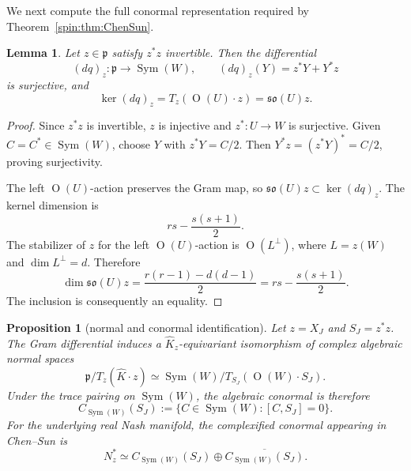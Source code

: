 \documentclass[11pt,reqno]{amsart}
\numberwithin{equation}{section}
\newtheorem{proposition}[theorem]{Proposition}
\newtheorem{lemma}[theorem]{Lemma}
\theoremstyle{definition}
\theoremstyle{remark}
\newcommand{\Or}{\operatorname{O}}
\newcommand{\Sym}{\operatorname{Sym}}
\newcommand{\fp}{\mathfrak p}
\begin{document}
We next compute the full conormal representation required by
Theorem~\ref{spin:thm:ChenSun}.

\begin{lemma}\label{spin:lem:dq}
Let $z\in\fp$ satisfy $z^*z$ invertible.  Then the differential
\[
  (dq)_z:\fp\longrightarrow\Sym(W),
  \qquad
  (dq)_z(Y)=z^*Y+Y^*z
\]
is surjective, and
\begin{equation}\label{spin:eq:kerdq}
  \ker(dq)_z=T_z(\Or(U)\cdot z)=\mathfrak{so}(U)z.
\end{equation}
\end{lemma}

\begin{proof}
Since $z^*z$ is invertible, $z$ is injective and $z^*:U\to W$ is surjective.
Given $C=C^*\in\Sym(W)$, choose $Y$ with $z^*Y=C/2$.  Then
$Y^*z=(z^*Y)^*=C/2$, proving surjectivity.

The left $\Or(U)$-action preserves the Gram map, so
$\mathfrak{so}(U)z\subset\ker(dq)_z$.  The kernel dimension is
\[
  rs-\frac{s(s+1)}2.
\]
The stabilizer of $z$ for the left $\Or(U)$-action is $\Or(L^\perp)$, where
$L=z(W)$ and $\dim L^\perp=d$.  Therefore
\[
  \dim \mathfrak{so}(U)z
  =\frac{r(r-1)-d(d-1)}2
  =rs-\frac{s(s+1)}2.
\]
The inclusion is consequently an equality.
\end{proof}

\begin{proposition}[normal and conormal identification]\label{spin:prop:normal-identification}
Let $z=X_J$ and $S_J=z^*z$.  The Gram differential induces a
$\widehat K_z$-equivariant isomorphism of complex algebraic normal spaces
\begin{equation}\label{spin:eq:normal-iso}
  \fp/T_z(\widehat K\cdot z)
  \simeq
  \Sym(W)/T_{S_J}(\Or(W)\cdot S_J).
\end{equation}
Under the trace pairing on $\Sym(W)$, the algebraic conormal is therefore
\begin{equation}\label{spin:eq:alg-conormal}
  C_{\Sym(W)}(S_J)
  :=\{C\in\Sym(W):[C,S_J]=0\}.
\end{equation}
For the underlying real Nash manifold, the complexified conormal appearing in
Chen--Sun is
\begin{equation}\label{spin:eq:real-conormal}
  N_z^*
  \simeq
  C_{\Sym(W)}(S_J)
  \oplus
  \overline{C_{\Sym(W)}(S_J)}.
\end{equation}
\end{proposition}
\end{document}
